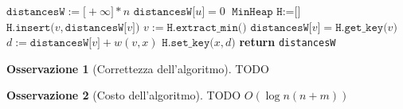 \documentclass[14pt]{extreport}
\theoremstyle{definition}
\theoremstyle{definition}
\newtheorem{remark}{Osservazione}[subsection]
\begin{document}
\begin{algorithm}[H]
    \caption{
        Dato un grafo pesato $G$ attraverso $w$, e $u \in V(G)$ un suo vertice, l'algoritmo restituisce le distanze pesate dei vertici di $G$ da $u$; l'algoritmo assume che ogni vertice di $G$ sia raggiungibile da $u$, e che ogni peso definito da $w$ sia positivo.\\
        \textbf{Input}: $G$ grafo, e $u$ un suo vertice tale che per ogni $x \in V(G)$ esiste un cammino della forma $u \rightarrow x$; $w$ una funzione che associa pesi agli archi in $E(G)$, tale che ogni peso sia positivo.\\
        \textbf{Output}: le distanze dei vertici di $G$ da $u$.
    }

    \begin{algorithmic}[1]
            \State $\texttt{distancesW} := \texttt{[}+ \infty \texttt{]} * n$ 
            \State $\texttt{distancesW[}u\texttt{]} = 0$
            \State $\texttt{MinHeap H} := \texttt{[]}$
                \State $\texttt{H.insert(}v, \texttt{distancesW[}v\texttt{]}\texttt{)}$ 
            \EndFor
                \State $v := \texttt{H.extract\_min()}$ 
                \State $\texttt{distancesW[}v\texttt{]} = \texttt{H.get\_key(}v\texttt{)}$
                    \State $d := \texttt{distancesW[}v\texttt{]} + w(v, x)$
                        \State $\texttt{H.set\_key(}x, d\texttt{)}$
                    \EndIf
                \EndFor
            \EndWhile
            \State \textbf{return} \texttt{distancesW}
        \EndFunction
    \end{algorithmic}
\end{algorithm}

\begin{remark}[Correttezza dell'algoritmo]
    TODO
\end{remark}

\begin{remark}[Costo dell'algoritmo]
    TODO $O(\log n(n + m))$
\end{remark}
\end{document}
